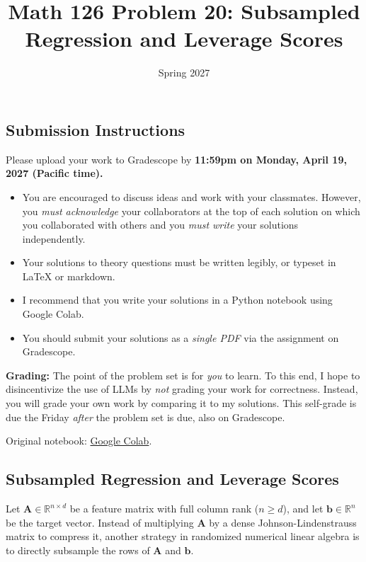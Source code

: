 \documentclass{article}
\title{Math 126 Problem 20: Subsampled Regression and Leverage Scores}
\author{} %
\date{Spring 2027}
\begin{document}
\maketitle

\hypertarget{submission-instructions}{%
\subsection*{Submission Instructions}\label{submission-instructions}}

Please upload your work to Gradescope by \textbf{11:59pm on Monday, April 19, 2027 (Pacific time).}

\begin{itemize}
\item
  You are encouraged to discuss ideas and work with your classmates. However, you \emph{must acknowledge} your collaborators at the top of each solution on which you collaborated with others and you \emph{must write} your solutions independently.
\item
  Your solutions to theory questions must be written legibly, or typeset in LaTeX or markdown.
\item
  I recommend that you write your solutions in a Python notebook using Google Colab.
\item
  You should submit your solutions as a \emph{single PDF} via the assignment on Gradescope.
\end{itemize}

\textbf{Grading:} The point of the problem set is for \emph{you} to learn. To this end, I hope to disincentivize the use of LLMs by \emph{not} grading your work for correctness. Instead, you will grade your own work by comparing it to my solutions. This self-grade is due the Friday \emph{after} the problem set is due, also on Gradescope.

\noindent Original notebook: \href{https://colab.research.google.com/drive/19Sy6yMog6Uyg_LBcSoLVjJpgErXq9GrF?usp=sharing}{Google Colab}.

\hypertarget{subsampled-regression-and-leverage-scores}{%
\subsection*{Subsampled Regression and Leverage Scores}\label{subsampled-regression-and-leverage-scores}}

Let \(\mathbf{A} \in \mathbb{R}^{n \times d}\) be a feature matrix with full column rank (\(n \geq d\)), and let \(\mathbf{b} \in \mathbb{R}^n\) be the target vector. Instead of multiplying \(\mathbf{A}\) by a dense Johnson-Lindenstrauss matrix to compress it, another strategy in randomized numerical linear algebra is to directly subsample the rows of \(\mathbf{A}\) and \(\mathbf{b}\).
\end{document}
